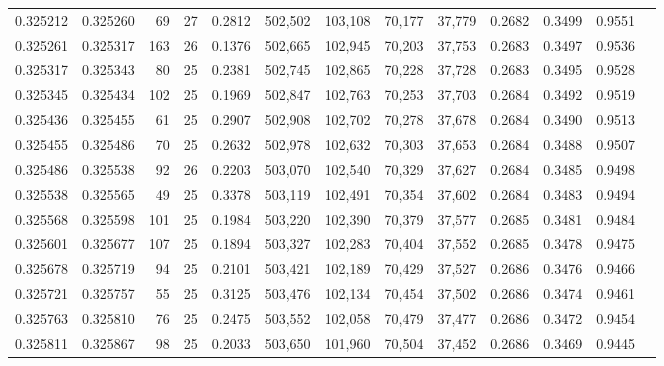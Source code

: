 \begin{tabular}{rrrrrrrrrrrrr}
0.325212 & 0.325260 &    69 &  27 &                                     0.2812 & 502,502 & 103,108 &  70,177 &  37,779 & 0.2682 & 0.3499 & 0.9551 \\
0.325261 & 0.325317 &   163 &  26 &                                     0.1376 & 502,665 & 102,945 &  70,203 &  37,753 & 0.2683 & 0.3497 & 0.9536 \\
0.325317 & 0.325343 &    80 &  25 &                                     0.2381 & 502,745 & 102,865 &  70,228 &  37,728 & 0.2683 & 0.3495 & 0.9528 \\
0.325345 & 0.325434 &   102 &  25 &                                     0.1969 & 502,847 & 102,763 &  70,253 &  37,703 & 0.2684 & 0.3492 & 0.9519 \\
0.325436 & 0.325455 &    61 &  25 &                                     0.2907 & 502,908 & 102,702 &  70,278 &  37,678 & 0.2684 & 0.3490 & 0.9513 \\
0.325455 & 0.325486 &    70 &  25 &                                     0.2632 & 502,978 & 102,632 &  70,303 &  37,653 & 0.2684 & 0.3488 & 0.9507 \\
0.325486 & 0.325538 &    92 &  26 &                                     0.2203 & 503,070 & 102,540 &  70,329 &  37,627 & 0.2684 & 0.3485 & 0.9498 \\
0.325538 & 0.325565 &    49 &  25 &                                     0.3378 & 503,119 & 102,491 &  70,354 &  37,602 & 0.2684 & 0.3483 & 0.9494 \\
0.325568 & 0.325598 &   101 &  25 &                                     0.1984 & 503,220 & 102,390 &  70,379 &  37,577 & 0.2685 & 0.3481 & 0.9484 \\
0.325601 & 0.325677 &   107 &  25 &                                     0.1894 & 503,327 & 102,283 &  70,404 &  37,552 & 0.2685 & 0.3478 & 0.9475 \\
0.325678 & 0.325719 &    94 &  25 &                                     0.2101 & 503,421 & 102,189 &  70,429 &  37,527 & 0.2686 & 0.3476 & 0.9466 \\
0.325721 & 0.325757 &    55 &  25 &                                     0.3125 & 503,476 & 102,134 &  70,454 &  37,502 & 0.2686 & 0.3474 & 0.9461 \\
0.325763 & 0.325810 &    76 &  25 &                                     0.2475 & 503,552 & 102,058 &  70,479 &  37,477 & 0.2686 & 0.3472 & 0.9454 \\
0.325811 & 0.325867 &    98 &  25 &                                     0.2033 & 503,650 & 101,960 &  70,504 &  37,452 & 0.2686 & 0.3469 & 0.9445 \\

\end{tabular}
